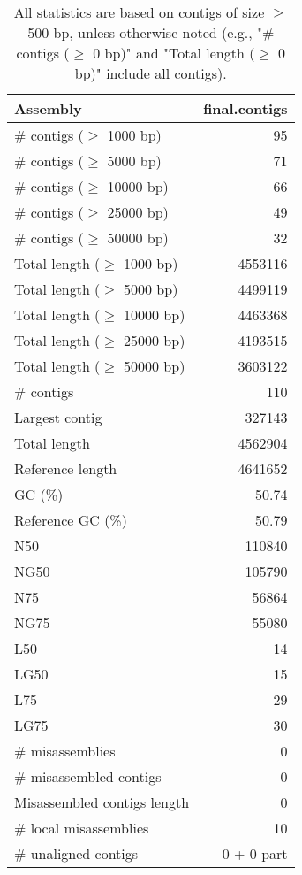 \documentclass[12pt,a4paper]{article}
\begin{document}
\begin{table}[ht]
\begin{center}
\caption{All statistics are based on contigs of size $\geq$ 500 bp, unless otherwise noted (e.g., "\# contigs ($\geq$ 0 bp)" and "Total length ($\geq$ 0 bp)" include all contigs).}
\begin{tabular}{|l*{1}{|r}|}
\hline
Assembly & final.contigs \\ \hline
\# contigs ($\geq$ 1000 bp) & 95 \\ \hline
\# contigs ($\geq$ 5000 bp) & 71 \\ \hline
\# contigs ($\geq$ 10000 bp) & 66 \\ \hline
\# contigs ($\geq$ 25000 bp) & 49 \\ \hline
\# contigs ($\geq$ 50000 bp) & 32 \\ \hline
Total length ($\geq$ 1000 bp) & 4553116 \\ \hline
Total length ($\geq$ 5000 bp) & 4499119 \\ \hline
Total length ($\geq$ 10000 bp) & 4463368 \\ \hline
Total length ($\geq$ 25000 bp) & 4193515 \\ \hline
Total length ($\geq$ 50000 bp) & 3603122 \\ \hline
\# contigs & 110 \\ \hline
Largest contig & 327143 \\ \hline
Total length & 4562904 \\ \hline
Reference length & 4641652 \\ \hline
GC (\%) & 50.74 \\ \hline
Reference GC (\%) & 50.79 \\ \hline
N50 & 110840 \\ \hline
NG50 & 105790 \\ \hline
N75 & 56864 \\ \hline
NG75 & 55080 \\ \hline
L50 & 14 \\ \hline
LG50 & 15 \\ \hline
L75 & 29 \\ \hline
LG75 & 30 \\ \hline
\# misassemblies & 0 \\ \hline
\# misassembled contigs & 0 \\ \hline
Misassembled contigs length & 0 \\ \hline
\# local misassemblies & 10 \\ \hline
\# unaligned contigs & 0 + 0 part \\ \hline

\end{tabular}
\end{center}
\end{table}
\end{document}
